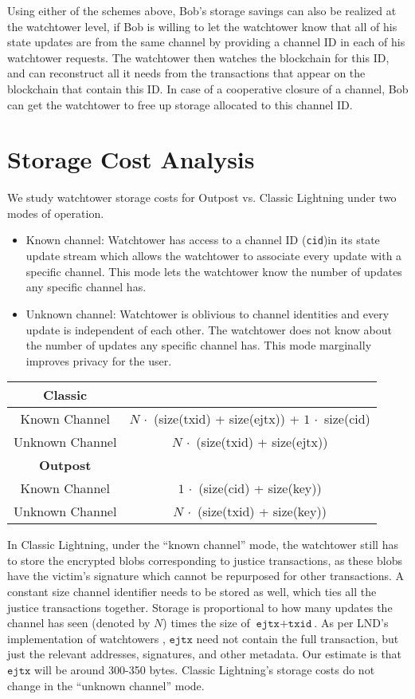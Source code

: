 Using either of the schemes above, Bob's storage savings can also be realized at the watchtower level, if Bob is willing to let the watchtower know that all of his state updates are from the same channel by providing a channel ID in each of his watchtower requests. The watchtower then watches the blockchain for this ID, and can reconstruct all it needs from the transactions that appear on the blockchain that contain this ID. In case of a cooperative closure of a channel, Bob can get the watchtower to free up storage allocated to this channel ID.

\section{Storage Cost Analysis}
\noindent
We study watchtower storage costs for Outpost vs. Classic Lightning under two modes of operation.
\begin{itemize}
    \item Known channel: Watchtower has access to a channel ID (\texttt{cid})in its state update stream which allows the watchtower to associate every update with a specific channel. This mode lets the watchtower know the number of updates any specific channel has. 
    \item Unknown channel: Watchtower is oblivious to channel identities and every update is independent of each other. The watchtower does not know about the number of updates any specific channel has. This mode marginally improves privacy for the user.
\end{itemize}

\begin{tabular}[b]{|c|c|}
\hline
              \textbf{Classic}  &           \\ \hline
Known Channel & $N\, \cdot$ (size(txid) + size(ejtx)) + $1\, \cdot$ size(cid) \\ \hline
Unknown Channel & $N\, \cdot$ (size(txid) + size(ejtx)) \\ \hline
               \textbf{Outpost}  &                 \\ \hline
Known Channel & $1\, \cdot$ (size(cid) + size(key)) \\ \hline
Unknown Channel & $N\, \cdot$ (size(txid) + size(key)) \\ \hline
\end{tabular}

\noindent
In Classic Lightning, under the ``known channel'' mode, the watchtower still has to store the encrypted blobs corresponding to justice transactions, as these blobs have the victim's signature which cannot be repurposed for other transactions. A constant size channel identifier needs to be stored as well, which ties all the justice transactions together. Storage is proportional to how many updates the channel has seen (denoted by $N$) times the size of $\texttt{ejtx} + \texttt{txid}$. As per LND's implementation of watchtowers \cite{lnd_watchtower}, $\texttt{ejtx}$ need not contain the full transaction, but just the relevant addresses, signatures, and other metadata. Our estimate is that $\texttt{ejtx}$ will be around 300-350 bytes. Classic Lightning's storage costs do not change in the ``unknown channel'' mode. 

